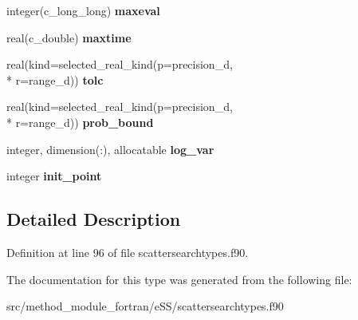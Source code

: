 \begin{DoxyCompactItemize}
\item 
\hypertarget{structscattersearchtypes_1_1uoptions_a9298651f6656c0222a91b13327b1d7ba}{integer(c\-\_\-long\-\_\-long) {\bfseries maxeval}}\label{structscattersearchtypes_1_1uoptions_a9298651f6656c0222a91b13327b1d7ba}

\item 
\hypertarget{structscattersearchtypes_1_1uoptions_ad453e254b04cf8ed8f9f7aecd4289f11}{real(c\-\_\-double) {\bfseries maxtime}}\label{structscattersearchtypes_1_1uoptions_ad453e254b04cf8ed8f9f7aecd4289f11}

\item 
\hypertarget{structscattersearchtypes_1_1uoptions_ac24ca40d1dc04ae11b291db19a762bd6}{real(kind=selected\-\_\-real\-\_\-kind(p=precision\-\_\-d, \\*
r=range\-\_\-d)) {\bfseries tolc}}\label{structscattersearchtypes_1_1uoptions_ac24ca40d1dc04ae11b291db19a762bd6}

\item 
\hypertarget{structscattersearchtypes_1_1uoptions_a630f35f64ae4b52d1726ed2021b45160}{real(kind=selected\-\_\-real\-\_\-kind(p=precision\-\_\-d, \\*
r=range\-\_\-d)) {\bfseries prob\-\_\-bound}}\label{structscattersearchtypes_1_1uoptions_a630f35f64ae4b52d1726ed2021b45160}

\item 
\hypertarget{structscattersearchtypes_1_1uoptions_ab1dcf00da5869c6e8b51544b1f6c48aa}{integer, dimension(\-:), allocatable {\bfseries log\-\_\-var}}\label{structscattersearchtypes_1_1uoptions_ab1dcf00da5869c6e8b51544b1f6c48aa}

\item 
\hypertarget{structscattersearchtypes_1_1uoptions_af1864bb81666f8575dd93e2993181c35}{integer {\bfseries init\-\_\-point}}\label{structscattersearchtypes_1_1uoptions_af1864bb81666f8575dd93e2993181c35}

\end{DoxyCompactItemize}


\subsection{Detailed Description}


Definition at line 96 of file scattersearchtypes.\-f90.



The documentation for this type was generated from the following file\-:\begin{DoxyCompactItemize}
\item 
src/method\-\_\-module\-\_\-fortran/e\-S\-S/scattersearchtypes.\-f90\end{DoxyCompactItemize}
